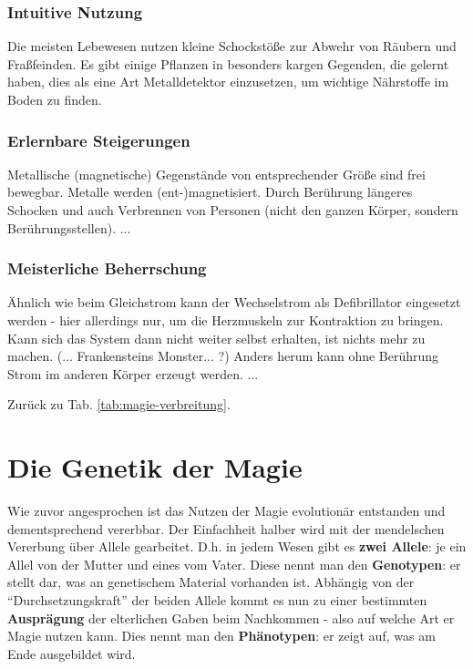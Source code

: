 \subsubsection{Intuitive Nutzung}
Die meisten Lebewesen nutzen kleine Schockstöße zur Abwehr von Räubern und Fraßfeinden. 
Es gibt einige Pflanzen in besonders kargen Gegenden, die gelernt haben, dies als eine Art Metalldetektor einzusetzen, um wichtige Nährstoffe im Boden zu finden.

\subsubsection{Erlernbare Steigerungen}
\begin{outline}
	\1 Metallische (magnetische) Gegenstände von entsprechender Größe sind frei bewegbar.
	\1 Metalle werden (ent-)magnetisiert.
	\1 Durch Berührung längeres Schocken und auch Verbrennen von Personen (nicht den ganzen Körper, sondern Berührungsstellen).
	\1 ...
\end{outline}

\subsubsection{Meisterliche Beherrschung} 
\begin{outline}
	\1 Ähnlich wie beim Gleichstrom kann der Wechselstrom als Defibrillator eingesetzt werden - hier allerdings nur, um die Herzmuskeln zur Kontraktion zu bringen.
	Kann sich das System dann nicht weiter selbst erhalten, ist nichts mehr zu machen.
	(... Frankensteins Monster... ?) %
	\1 Anders herum kann ohne Berührung Strom im anderen Körper erzeugt werden.
	\1 ...
\end{outline}
Zurück zu Tab. \ref{tab:magie-verbreitung}.















\section{Die Genetik der Magie}
Wie zuvor angesprochen ist das Nutzen der Magie evolutionär entstanden und dementsprechend vererbbar.
Der Einfachheit halber wird mit der mendelschen Vererbung über Allele gearbeitet.
D.h. in jedem Wesen gibt es \textbf{zwei Allele}: je ein Allel von der Mutter und eines vom Vater.
Diese nennt man den \textbf{Genotypen}: er stellt dar, was an genetischem Material vorhanden ist.
Abhängig von der "`Durchsetzungskraft"' der beiden Allele kommt es nun zu einer bestimmten \textbf{Ausprägung} der elterlichen Gaben beim Nachkommen - also auf welche Art er Magie nutzen kann.
Dies nennt man den \textbf{Phänotypen}: er zeigt auf, was am Ende ausgebildet wird.

